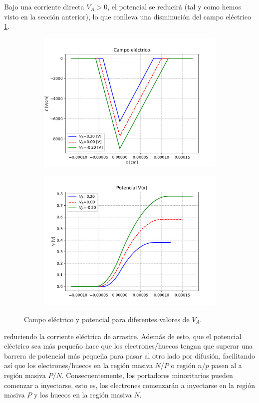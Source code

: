 Bajo una corriente directa $V_A>0$, el potencial se reducirá (tal y como hemos visto en la sección anterior), lo que conlleva una disminución del campo eléctrico \cref{Fig:03_01}.

\begin{figure}[h!]
\centering
\begin{subfigure}{0.47\textwidth}
    \includegraphics[width=\textwidth]{Cuerpo/Ch_03/03_04_E.pdf}
\end{subfigure}
\begin{subfigure}{0.47\textwidth}
    \includegraphics[width=\textwidth]{Cuerpo/Ch_03/03_05_V.pdf}
\end{subfigure}
\caption{Campo eléctrico y potencial para diferentes valores de $V_A$.}
\label{Fig:03_01}
\end{figure}
reduciendo la corriente eléctrica de arrastre. Además de esto, que el potencial eléctrico sea más pequeño hace que los electrones/huecos tengan que superar una barrera de potencial más pequeña para pasar al otro lado por difusión, facilitando así que los electrones/huecos en la región masiva $N$/$P$ o región $n/p$ pasen al a región masiva $P/N$. Consecuentemente, los portadores minoritarios pueden comenzar a inyectarse, esto es, los electrones comenzarán a inyectarse en la región masiva $P$ y los huecos en la región masiva $N$. 

